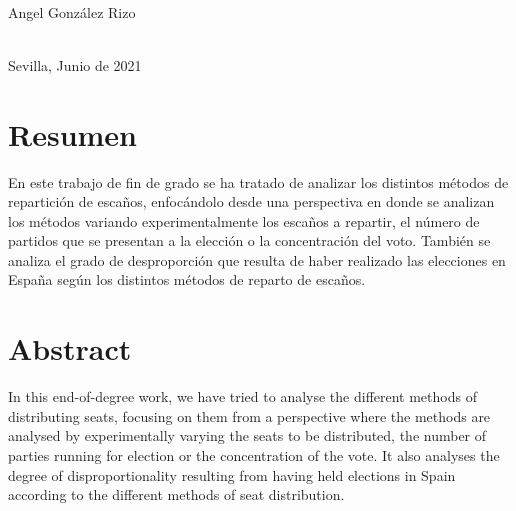 \documentclass[12pt,a4paper,]{book}
\def\ifdoblecara{} %
\numberwithin{dummy}{section}
\theoremstyle{ocrenumbox}
\theoremstyle{blacknumex}
\theoremstyle{blacknumbox}
\theoremstyle{ocrenum}
\theoremstyle{ocrenum}
\begin{document}
\begin{titlepage}
\begin{minipage}{14cm}
\HRule \\[4cm]


{\Large

Angel González Rizo} \\[0.5cm]

{\large
Sevilla, Junio de 2021
}

\end{minipage}

\vfill %

\cleardoublepage
\thispagestyle{empty}
\end{titlepage}

\raggedbottom


\setlength{\parindent}{1em}

\pagestyle{fancy}
\ifdefined\ifdoblecara
\fancyhead[LE,RO]{}
\fancyhead[LO,RE]{}
\else
\fancyhead[RO]{}
\fancyhead[LO]{}
\fi
\renewcommand{\headrulewidth}{0pt}
\renewcommand{\footrulewidth}{0pt}

\setcounter{tocdepth}{2}
\tableofcontents

\cleardoublepage

\section*{Resumen}

En este trabajo de fin de grado se ha tratado de analizar los distintos
métodos de repartición de escaños, enfocándolo desde una perspectiva en
donde se analizan los métodos variando experimentalmente los escaños a
repartir, el número de partidos que se presentan a la elección o la
concentración del voto. También se analiza el grado de desproporción que
resulta de haber realizado las elecciones en España según los distintos
métodos de reparto de escaños.

\clearpage
\section*{Abstract}

In this end-of-degree work, we have tried to analyse the different
methods of distributing seats, focusing on them from a perspective where
the methods are analysed by experimentally varying the seats to be
distributed, the number of parties running for election or the
concentration of the vote. It also analyses the degree of
disproportionality resulting from having held elections in Spain
according to the different methods of seat distribution.
\end{document}
